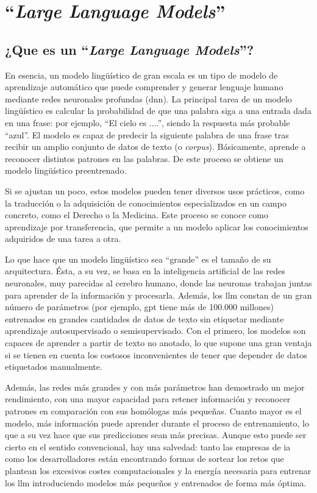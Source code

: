 \section{``\textit{Large Language Models}''}

\subsection{¿Que es un ``\textit{Large Language Models}''?}

En esencia, un modelo lingüístico de gran escala es un tipo de modelo de aprendizaje automático que puede comprender y generar lenguaje humano mediante redes neuronales profundas (\acrlong{dnn}). La principal tarea de un modelo lingüístico es calcular la probabilidad de que una palabra siga a una entrada dada en una frase: por ejemplo, ``El cielo es ....'', siendo la respuesta más probable ``azul''. El modelo es capaz de predecir la siguiente palabra de una frase tras recibir un amplio conjunto de datos de texto (o \textit{corpus}). Básicamente, aprende a reconocer distintos patrones en las palabras. De este proceso se obtiene un modelo lingüístico preentrenado.

Si se ajustan un poco, estos modelos pueden tener diversos usos prácticos, como la traducción o la adquisición de conocimientos especializados en un campo concreto, como el Derecho o la Medicina. Este proceso se conoce como aprendizaje por transferencia, que permite a un modelo aplicar los conocimientos adquiridos de una tarea a otra.

Lo que hace que un modelo lingüístico sea ``grande'' es el tamaño de su arquitectura. Ésta, a su vez, se basa en la inteligencia artificial de las redes neuronales, muy parecidas al cerebro humano, donde las neuronas trabajan juntas para aprender de la información y procesarla. Además, los \acrshort{llm} constan de un gran número de parámetros (por ejemplo, \acrshort{gpt} tiene más de 100.000 millones) entrenados en grandes cantidades de datos de texto sin etiquetar mediante aprendizaje autosupervisado o semisupervisado. Con el primero, los modelos son capaces de aprender a partir de texto no anotado, lo que supone una gran ventaja si se tienen en cuenta los costosos inconvenientes de tener que depender de datos etiquetados manualmente.

Además, las redes más grandes y con más parámetros han demostrado un mejor rendimiento, con una mayor capacidad para retener información y reconocer patrones en comparación con sus homólogas más pequeñas. Cuanto mayor es el modelo, más información puede aprender durante el proceso de entrenamiento, lo que a su vez hace que sus predicciones sean más precisas. Aunque esto puede ser cierto en el sentido convencional, hay una salvedad: tanto las empresas de \acrshort{ia} como los desarrolladores están encontrando formas de sortear los retos que plantean los excesivos costes computacionales y la energía necesaria para entrenar los \acrshort{llm} introduciendo modelos más pequeños y entrenados de forma más óptima.

